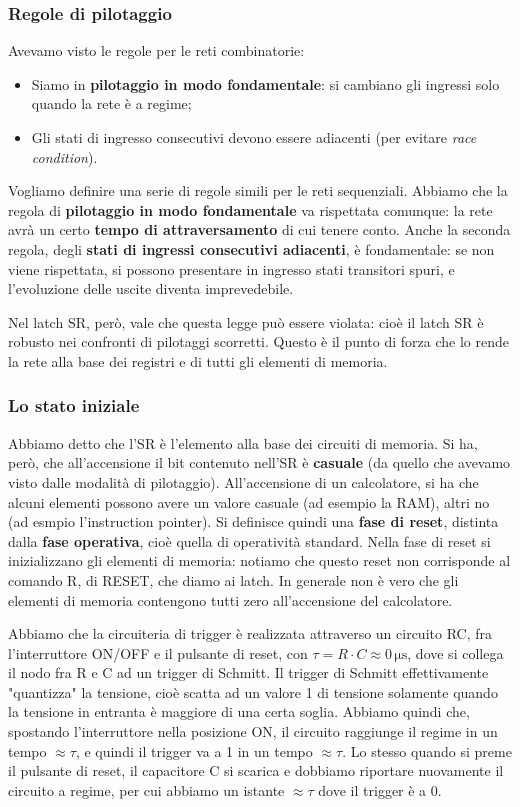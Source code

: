 \documentclass[a4paper,11pt]{article}
\begin{document}
\subsubsection{Regole di pilotaggio}
Avevamo visto le regole per le reti combinatorie:
\begin{itemize}
	\item Siamo in \textbf{pilotaggio in modo fondamentale}: si cambiano gli ingressi solo quando la rete è a regime;
	\item Gli stati di ingresso consecutivi devono essere adiacenti (per evitare \textit{race condition}).
\end{itemize}

Vogliamo definire una serie di regole simili per le reti sequenziali.
Abbiamo che la regola di \textbf{pilotaggio in modo fondamentale} va rispettata comunque: la rete avrà un certo \textbf{tempo di attraversamento} di cui tenere conto.
Anche la seconda regola, degli \textbf{stati di ingressi consecutivi adiacenti}, è fondamentale: se non viene rispettata, si possono presentare in ingresso stati transitori spuri, e l'evoluzione delle uscite diventa imprevedebile.

Nel latch SR, però, vale che questa legge può essere violata: cioè il latch SR è robusto nei confronti di pilotaggi scorretti.
Questo è il punto di forza che lo rende la rete alla base dei registri e di tutti gli elementi di memoria.

\subsubsection{Lo stato iniziale}
Abbiamo detto che l'SR è l'elemento alla base dei circuiti di memoria.
Si ha, però, che all'accensione il bit contenuto nell'SR è \textbf{casuale} (da quello che avevamo visto dalle modalità di pilotaggio).
All'accensione di un calcolatore, si ha che alcuni elementi possono avere un valore casuale (ad esempio la RAM), altri no (ad esmpio l'instruction pointer).
Si definisce quindi una \textbf{fase di reset}, distinta dalla \textbf{fase operativa}, cioè quella di operatività standard.
Nella fase di reset si inizializzano gli elementi di memoria: notiamo che questo reset non corrisponde al comando R, di RESET, che diamo ai latch.
In generale non è vero che gli elementi di memoria contengono tutti zero all'accensione del calcolatore.

Abbiamo che la circuiteria di trigger è realizzata attraverso un circuito RC, fra l'interruttore ON/OFF e il pulsante di reset, con $\tau = R \cdot C \approx 0 \, \mathrm{\mu s}$, dove si collega il nodo fra R e C ad un trigger di Schmitt.
Il trigger di Schmitt effettivamente "quantizza" la tensione, cioè scatta ad un valore 1 di tensione solamente quando la tensione in entranta è maggiore di una certa soglia.
Abbiamo quindi che, spostando l'interruttore nella posizione ON, il circuito raggiunge il regime in un tempo $\approx \tau$, e quindi il trigger va a 1 in un tempo $\approx \tau$. Lo stesso quando si preme il pulsante di reset, il capacitore C si scarica e dobbiamo riportare nuovamente il circuito a regime, per cui abbiamo un istante $\approx \tau$ dove il trigger è a 0. 
\end{document}
